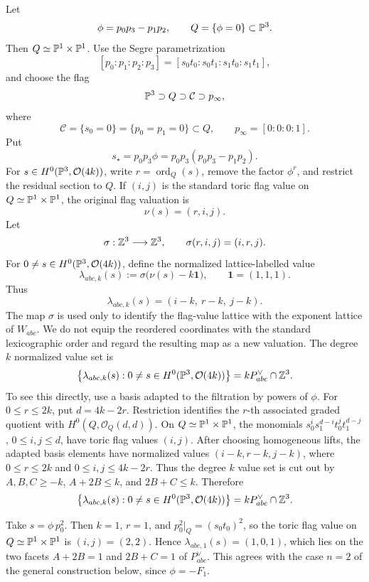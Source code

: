 Let
\[
\phi=p_0p_3-p_1p_2,
\qquad
Q=\{\phi=0\}\subset\mathbb{P}^3.
\]
Then \(Q\simeq\mathbb{P}^1\times\mathbb{P}^1\). Use the Segre parametrization
\[
[p_0:p_1:p_2:p_3]
=
[s_0t_0:s_0t_1:s_1t_0:s_1t_1],
\]
and choose the flag
\[
\mathbb{P}^3\supset Q\supset \mathcal C\supset p_\infty,
\]
where
\[
\mathcal C=\{s_0=0\}=\{p_0=p_1=0\}\subset Q,
\qquad
p_\infty=[0:0:0:1].
\]
Put
\[
s_\star=p_0p_3\phi=p_0p_3(p_0p_3-p_1p_2).
\]
For \(s\in H^0(\mathbb{P}^3,\mathcal O(4k))\), write \(r=\operatorname{ord}_Q(s)\), remove the factor \(\phi^r\), and restrict the residual section to \(Q\). If \((i,j)\) is the standard toric flag value on \(Q\simeq\mathbb{P}^1\times\mathbb{P}^1\), the original flag valuation is
\[
\nu(s)=(r,i,j).
\]
Let
\[
\sigma:\mathbb{Z}^3\longrightarrow\mathbb{Z}^3,
\qquad
\sigma(r,i,j)=(i,r,j).
\]
For \(0\ne s\in H^0(\mathbb{P}^3,\mathcal O(4k))\), define the normalized lattice-labelled value
\[
\lambda_{abc,k}(s)
:=
\sigma\bigl(\nu(s)-k\mathbf 1\bigr),
\qquad
\mathbf 1=(1,1,1).
\]
Thus
\[
\lambda_{abc,k}(s)
=
(i-k,\ r-k,\ j-k).
\]
The map \(\sigma\) is used only to identify the flag-value lattice with the exponent lattice of \(W_{abc}\). We do not equip the reordered coordinates with the standard lexicographic order and regard the resulting map as a new valuation.
The degree \(k\) normalized value set is
\[
\left\{
\lambda_{abc,k}(s):
0\ne s\in H^0(\mathbb{P}^3,\mathcal O(4k))
\right\}
=
kP_{abc}^{\vee}\cap\mathbb{Z}^3.
\]
To see this directly, use a basis adapted to the filtration by powers of \(\phi\). For \(0\le r\le 2k\), put \(d=4k-2r\). Restriction identifies the \(r\)-th associated graded quotient with \(H^0(Q,\mathcal O_Q(d,d))\). On \(Q\simeq\mathbb{P}^1\times\mathbb{P}^1\), the monomials \(s_0^is_1^{d-i}t_0^jt_1^{d-j}\), \(0\le i,j\le d\), have toric flag values \((i,j)\). After choosing homogeneous lifts, the adapted basis elements have normalized values \((i-k,r-k,j-k)\), where \(0\le r\le2k\) and \(0\le i,j\le4k-2r\). Thus the degree \(k\) value set is cut out by \(A,B,C\ge-k\), \(A+2B\le k\), and \(2B+C\le k\). Therefore
\[
\left\{
\lambda_{abc,k}(s):
0\ne s\in H^0(\mathbb{P}^3,\mathcal O(4k))
\right\}
=
kP_{abc}^\vee\cap\mathbb{Z}^3.
\]

\begin{exam}
Take \(s=\phi\,p_0^2\). Then \(k=1\), \(r=1\), and \(p_0^2|_Q=(s_0t_0)^2\), so the toric flag value on \(Q\simeq\mathbb{P}^1\times\mathbb{P}^1\) is \((i,j)=(2,2)\). Hence \(\lambda_{abc,1}(s)=(1,0,1)\), which lies on the two facets \(A+2B=1\) and \(2B+C=1\) of \(P_{abc}^\vee\). This agrees with the case \(n=2\) of the general construction below, since \(\phi=-F_1\).
\end{exam}

